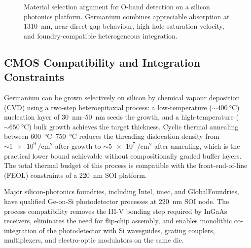 \begin{figure}[H]
    \centering
    \caption{Material selection argument for O-band detection on a silicon
    photonics platform. Germanium combines appreciable absorption at
    \SI{1310}{\nano\metre}, near-direct-gap behaviour, high hole saturation
    velocity, and foundry-compatible heterogeneous integration.}
    \label{fig:ge_vs_si_material}
\end{figure}

\subsection[CMOS Compatibility and Integration Constraints]{CMOS Compatibility and Integration Constraints}
\label{subsec:pd_ge_integration}

Germanium can be grown selectively on silicon by chemical vapour deposition (CVD)
using a two-step heteroepitaxial process: a low-temperature ($\sim\SI{400}{\celsius}$)
nucleation layer of \SIrange{30}{50}{\nano\metre} seeds the growth, and a
high-temperature ($\sim\SI{650}{\celsius}$) bulk growth achieves the target
thickness. Cyclic thermal annealing between \SIrange{600}{750}{\celsius}
reduces the threading dislocation density from
$\sim\SI{1e9}{\per\centi\metre\squared}$ after growth to
$\sim\SI{5e7}{\per\centi\metre\squared}$ after annealing, which is the practical
lower bound achievable without compositionally graded buffer layers. The total
thermal budget of this process is compatible with the front-end-of-line (FEOL)
constraints of a \SI{220}{\nano\metre} SOI platform.

Major silicon-photonics foundries, including Intel, imec, and GlobalFoundries,
have qualified Ge-on-Si photodetector processes at \SI{220}{\nano\metre} SOI node.
The process compatibility removes the III-V bonding step required by InGaAs
receivers, eliminates the need for flip-chip assembly, and enables monolithic
co-integration of the photodetector with Si waveguides, grating couplers,
multiplexers, and electro-optic modulators on the same die.

